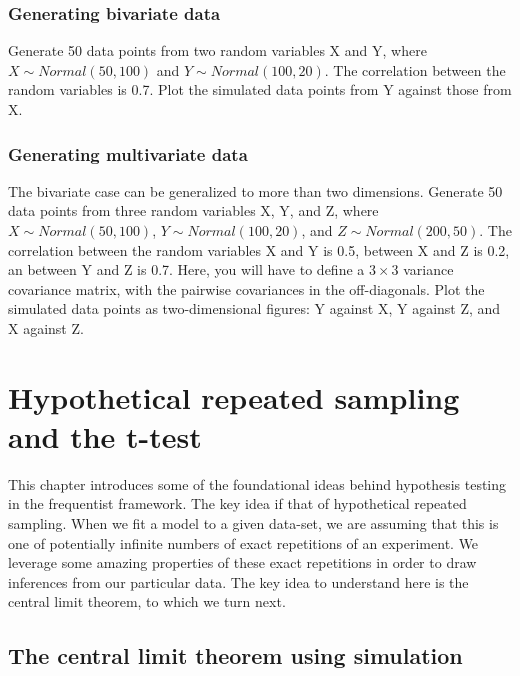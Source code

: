 \documentclass[12pt,]{krantz}
\begin{document}
\hypertarget{sec:Foundationsexercisesbivar}{%
\subsection{Generating bivariate data}\label{sec:Foundationsexercisesbivar}}

Generate 50 data points from two random variables X and Y, where \(X\sim Normal(50,100)\) and \(Y\sim Normal(100,20)\). The correlation between the random variables is 0.7. Plot the simulated data points from Y against those from X.

\hypertarget{sec:Foundationsexercisesmultivar}{%
\subsection{Generating multivariate data}\label{sec:Foundationsexercisesmultivar}}

The bivariate case can be generalized to more than two dimensions.
Generate 50 data points from three random variables X, Y, and Z, where \(X\sim Normal(50,100)\), \(Y\sim Normal(100,20)\), and \(Z\sim Normal(200,50)\). The correlation between the random variables X and Y is 0.5, between X and Z is 0.2, an between Y and Z is 0.7. Here, you will have to define a \(3\times 3\) variance covariance matrix, with the pairwise covariances in the off-diagonals. Plot the simulated data points as two-dimensional figures: Y against X, Y against Z, and X against Z.

\hypertarget{hypothetical-repeated-sampling-and-the-t-test}{%
\chapter{Hypothetical repeated sampling and the t-test}\label{hypothetical-repeated-sampling-and-the-t-test}}

This chapter introduces some of the foundational ideas behind hypothesis testing in the frequentist framework. The key idea if that of hypothetical repeated sampling. When we fit a model to a given data-set, we are assuming that this is one of potentially infinite numbers of exact repetitions of an experiment. We leverage some amazing properties of these exact repetitions in order to draw inferences from our particular data. The key idea to understand here is the central limit theorem, to which we turn next.

\hypertarget{the-central-limit-theorem-using-simulation}{%
\section{The central limit theorem using simulation}\label{the-central-limit-theorem-using-simulation}}
\end{document}
